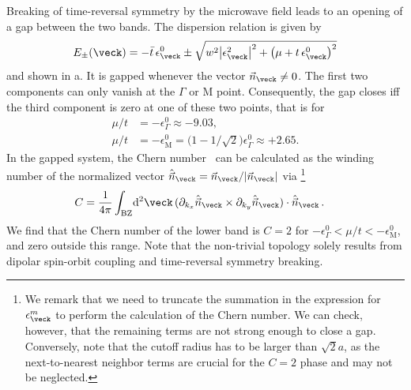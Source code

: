 Breaking of time-reversal symmetry by the microwave field leads to an opening of a gap between the two bands.
The dispersion relation is given by
\begin{align}
    E_\pm(\veck)=- \bar{t}\, \epsilon^0_\veck \pm \sqrt{w^2 \big|\epsilon^2_{\veck}\big|^2+\big(\mu+t\, \epsilon^0_{\veck}\big)^2}
\end{align}
and shown in a.
It is gapped whenever the vector $\vec{n}_{\veck}\ne 0$.
The first two components can only vanish at the $\Gamma$ or $\text{M}$ point.
Consequently, the gap closes iff the third component is zero at one of these two points, that is for
\begin{align} %
    \mu/t &= -\epsilon^0_{\Gamma} \approx -9.03, \nonumber\\
    \mu/t &= -\epsilon^0_\text{M} = \Big(1-1/\sqrt{2}\Big)\epsilon_{\Gamma}^0 \approx +2.65.
\end{align}
In the gapped system, the Chern number~\cite{Hasan2010,Qi2011} can be calculated as the winding number of the normalized vector $\hat{\vec{n}}_\veck = \vec{n}_\veck/|\vec{n}_\veck|$ via
\footnote{We remark that we need to truncate the summation in the expression for $\epsilon^m_{\veck}$ to perform the calculation of the Chern number.
We can check, however, that the remaining terms are not strong enough to close a gap.
Conversely, note that the cutoff radius has to be larger than $\sqrt{2}a$, as the next-to-nearest neighbor terms are crucial for the $C=2$ phase and may not be neglected.}
\begin{align}
    C &= \frac{1}{4\pi}\int_{\text{BZ}}\!\mathrm{d}{^2\veck}\, ( \partial_{k_x} \hat{\vec{n}}_{\veck} \times \partial_{k_y} \hat{\vec{n}}_{\veck} ) \cdot \hat{\vec{n}}_{\veck} \, . \label{eq:chern}
\end{align}
We find that the Chern number of the lower band is $C=2$ for $-\epsilon^0_{\Gamma} < \mu/t < -\epsilon^0_\text{M}$, and zero outside this range.
Note that the non-trivial topology solely results from dipolar spin-orbit coupling and time-reversal symmetry breaking.



